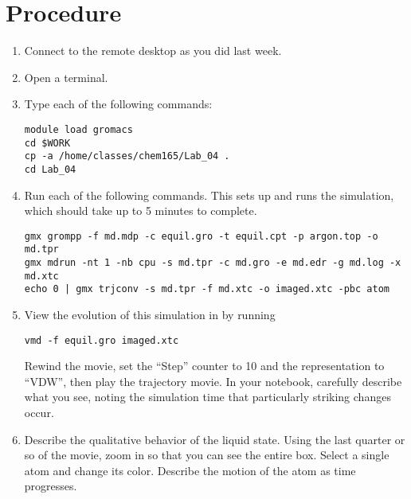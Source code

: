 \documentclass{article}
\begin{document}
\section{Procedure}
\begin{enumerate}
  \item Connect to the remote desktop as you did last week.
  \item Open a terminal.
  \item Type each of the following commands:
\begin{Verbatim}
module load gromacs
cd $WORK
cp -a /home/classes/chem165/Lab_04 .
cd Lab_04
\end{Verbatim}
  \item Run each of the following commands.
    This sets up and runs the simulation, which should take up to 5 minutes to complete.
\begin{Verbatim}
gmx grompp -f md.mdp -c equil.gro -t equil.cpt -p argon.top -o md.tpr
gmx mdrun -nt 1 -nb cpu -s md.tpr -c md.gro -e md.edr -g md.log -x md.xtc
echo 0 | gmx trjconv -s md.tpr -f md.xtc -o imaged.xtc -pbc atom
\end{Verbatim}
  \item View the evolution of this simulation in  by running
\begin{Verbatim}
vmd -f equil.gro imaged.xtc
\end{Verbatim}
    Rewind the movie, set the “Step” counter to 10 and the representation to “VDW”, then play the trajectory movie.
    In your notebook, carefully describe what you see, noting the simulation time that particularly striking changes occur.
  \item Describe the qualitative behavior of the liquid state.
    Using the last quarter or so of the movie, zoom in so that you can see the entire box.
    Select a single atom and change its color.
    Describe the motion of the atom as time progresses.

\end{enumerate}
\end{document}
